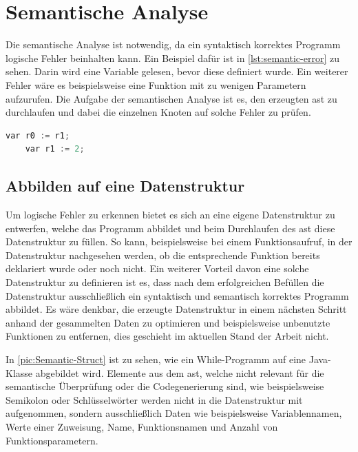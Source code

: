 \chapter{Semantische Analyse} \label{chap:semantic}

Die semantische Analyse ist notwendig, da ein syntaktisch korrektes Programm logische Fehler beinhalten kann. Ein Beispiel dafür ist in \cref{lst:semantic-error} zu sehen. Darin wird eine Variable gelesen, bevor diese definiert wurde. Ein weiterer Fehler wäre es beispielsweise eine Funktion mit zu wenigen Parametern aufzurufen. Die Aufgabe der semantischen Analyse ist es, den erzeugten \ac{ast} zu durchlaufen und dabei die einzelnen Knoten auf solche Fehler zu prüfen.

\begin{lstlisting}[language=c, caption=Inhalt der generierten BaseVisitor-Klasse, label={lst:semantic-error}]
	var r0 := r1;
	var r1 := 2;
\end{lstlisting}

\section{Abbilden auf eine Datenstruktur}
Um logische Fehler zu erkennen bietet es sich an eine eigene Datenstruktur zu entwerfen, welche das Programm abbildet und beim Durchlaufen des \ac{ast} diese Datenstruktur zu füllen. So kann, beispielsweise bei einem Funktionsaufruf, in der Datenstruktur nachgesehen werden, ob die entsprechende Funktion bereits deklariert wurde oder noch nicht. Ein weiterer Vorteil davon eine solche Datenstruktur zu definieren ist es, dass nach dem erfolgreichen Befüllen die Datenstruktur ausschließlich ein syntaktisch und semantisch korrektes Programm abbildet. Es wäre denkbar, die erzeugte Datenstruktur in einem nächsten Schritt anhand der gesammelten Daten zu optimieren und beispielsweise unbenutzte Funktionen zu entfernen, dies geschieht im aktuellen Stand der Arbeit nicht. 

In \cref{pic:Semantic-Struct} ist zu sehen, wie ein While-Programm auf eine Java-Klasse abgebildet wird. Elemente aus dem \ac{ast}, welche nicht relevant für die semantische Überprüfung oder die Codegenerierung sind, wie beispielsweise Semikolon oder Schlüsselwörter werden nicht in die Datenstruktur mit aufgenommen, sondern ausschließlich Daten wie beispielsweise Variablennamen, Werte einer Zuweisung, Name, Funktionsnamen und Anzahl von Funktionsparametern.

